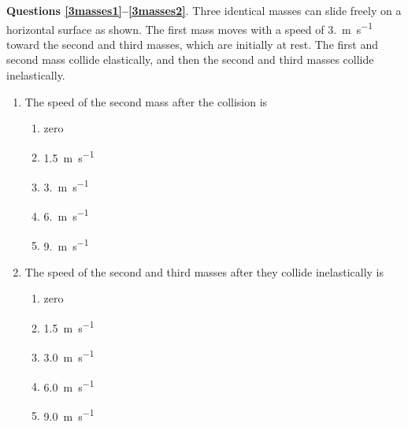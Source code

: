 \documentclass{../../../oss-apphys}
\begin{document}
\begin{multicols}{2}
  \textbf{Questions \ref{3masses1}--\ref{3masses2}}. Three identical masses can
  slide freely on a horizontal surface as shown. The first mass moves with a
  speed of \SI{3.}{\metre\per\second} toward the second and third masses, which
  are initially at rest. The first and second mass collide elastically, and
  then the second and third masses collide inelastically.
  \begin{center}
  \end{center}
  \begin{enumerate}[leftmargin=18pt,resume]
  \item The speed of the second mass after the collision is
    \label{3masses1}
    \begin{enumerate}[nosep,leftmargin=18pt,label=(\Alph*)]
    \item zero
    \item\SI{1.5}{\metre\per\second}
    \item\SI{3.}{\metre\per\second}
    \item\SI{6.}{\metre\per\second}
    \item\SI{9.}{\metre\per\second}
    \end{enumerate}

  \item The speed of the second and third masses after they collide
    inelastically is
    \label{3masses2}
    \begin{enumerate}[nosep,leftmargin=18pt,label=(\Alph*)]
    \item zero
    \item\SI{1.5}{\metre\per\second}
    \item\SI{3.0}{\metre\per\second}
    \item\SI{6.0}{\metre\per\second}
    \item\SI{9.0}{\metre\per\second}
    \end{enumerate}
 

\end{enumerate}
\end{multicols}
\end{document}
